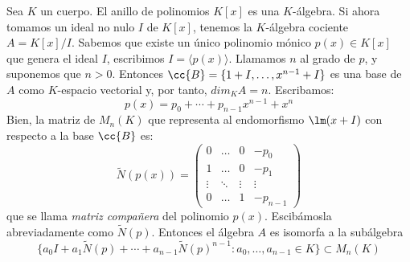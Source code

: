 \begin{ejerciciostar}
    Sea $K$ un cuerpo. El anillo de polinomios $K[x]$ es una $K$-álgebra. Si ahora tomamos un ideal no nulo $I$ de $K[x]$, tenemos la $K$-álgebra cociente $A = K[x]/I$. Sabemos que existe un único polinomio mónico $p(x) \in K[x]$ que genera el ideal $I$, escribimos $I = \langle p(x) \rangle $. Llamamos $n$ al grado de $p$, y suponemos que $n>0$. Entonces $\cc{B} = \{1+I, \ldots, x^{n-1} + I\}$ es una base de $A$ como $K$-espacio vectorial y, por tanto, $dim_KA = n$. Escribamos:
    \begin{equation*}
        p(x) =  p_0 + \cdots + p_{n-1}x^{n-1} + x^n
    \end{equation*}
    Bien, la matriz de $M_n(K)$ que representa al endomorfismo $\lm(x+I)$ con respecto a la base $\cc{B}$ es:
    \begin{equation*}
        \tilde{N}(p(x)) = \left(\begin{array}{cccc}
            0 & \ldots & 0 & -p_{0} \\
            1 & \ldots & 0 & -p_1 \\
            \vdots & \ddots & \vdots & \vdots \\
            0 & \ldots & 1 & -p_{n-1} 
        \end{array}\right)
    \end{equation*}
    que se llama \textit{matriz compañera} del polinomio $p(x)$. Escibámosla abreviadamente como $\tilde{N}(p)$. Entonces el álgebra $A$ es isomorfa a la subálgebra 
    \begin{equation*}
        \{a_0I + a_1\tilde{N}(p) + \cdots + a_{n-1}\tilde{N}(p)^{n-1} : a_0,\ldots, a_{n-1} \in K\} \subset M_n(K)
    \end{equation*}
\end{ejerciciostar}

